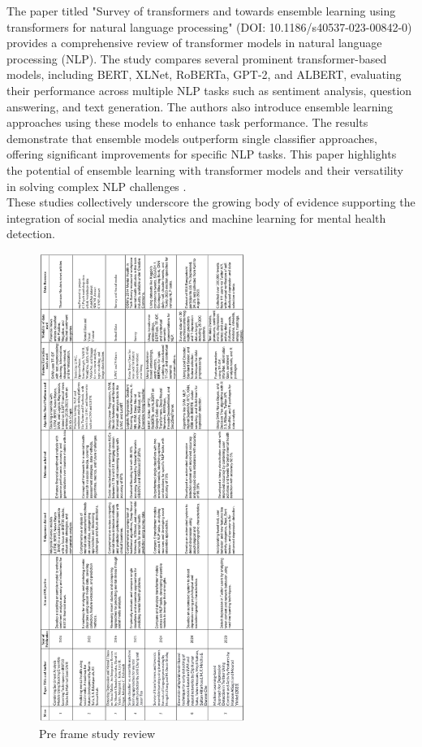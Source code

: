 \noindent
The paper titled "Survey of transformers and towards ensemble learning using transformers for natural language processing" (DOI: 10.1186/s40537-023-00842-0) provides a comprehensive review of transformer models in natural language processing (NLP). The study compares several prominent transformer-based models, including BERT, XLNet, RoBERTa, GPT-2, and ALBERT, evaluating their performance across multiple NLP tasks such as sentiment analysis, question answering, and text generation. The authors also introduce ensemble learning approaches using these models to enhance task performance. The results demonstrate that ensemble models outperform single classifier approaches, offering significant improvements for specific NLP tasks. This paper highlights the potential of ensemble learning with transformer models and their versatility in solving complex NLP challenges \cite{Zhang_2024}. \\

\noindent
These studies collectively underscore the growing body of evidence supporting the integration of social media analytics and machine learning for mental health detection.



\begin{figure}[h!]  
    \centering
    \includegraphics[width=0.6\textwidth]{Images/preframe-study.png}  
    \caption{Pre frame study review}
    \label{Preframe Study Review}  %
\end{figure}

